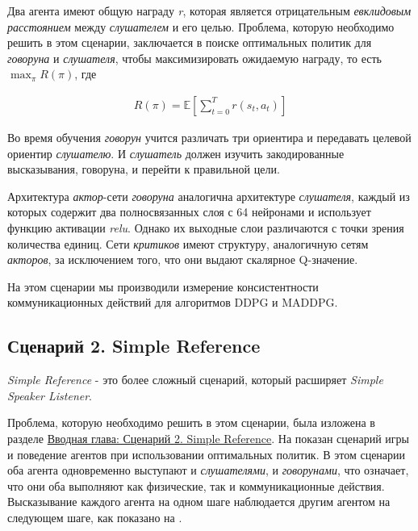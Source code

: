 Два агента имеют общую награду \textit{r}, которая является отрицательным \textit{евклидовым расстоянием} между \textit{слушателем} и его целью. Проблема, которую необходимо решить в этом сценарии, заключается в поиске оптимальных политик для \textit{говоруна} и \textit{слушателя}, чтобы максимизировать ожидаемую награду, то есть $\max_{\pi}R(\pi)$, где

\begin{equation}
    \begin{multlined}
        R(\pi) = \mathbb{E}[\sum_{t=0}^{T}r(s_t, a_t)]
    \end{multlined}
\end{equation}

Во время обучения \textit{говорун} учится различать три ориентира и передавать целевой ориентир \textit{слушателю}. И \textit{слушатель} должен изучить закодированные высказывания, говоруна, и перейти к правильной цели.

Архитектура \textit{актор}-сети \textit{говоруна} аналогична архитектуре \textit{слушателя}, каждый из которых содержит два полносвязанных слоя с 64 нейронами и использует функцию активации \textit{relu}. Однако их выходные слои различаются с точки зрения количества единиц. Сети \textit{критиков} имеют структуру, аналогичную сетям \textit{акторов}, за исключением того, что они выдают скалярное Q-значение.

На этом сценарии мы производили измерение консистентности коммуникационных действий для алгоритмов DDPG и MADDPG.

\subsection{Сценарий 2. Simple Reference} \label{exp-sr}

\textit{Simple Reference} - это более сложный сценарий, который расширяет \textit{Simple Speaker Listener}.

Проблема, которую необходимо решить в этом сценарии, была изложена в разделе \hyperref[intro-sr]{Вводная глава: Сценарий 2. Simple Reference}. На  показан сценарий игры и поведение агентов при использовании оптимальных политик. В этом сценарии оба агента одновременно выступают и \textit{слушателями}, и \textit{говорунами}, что означает, что они оба выполняют как физические, так и коммуникационные действия. Высказывание каждого агента на одном шаге наблюдается другим агентом на следующем шаге, как показано на . %

